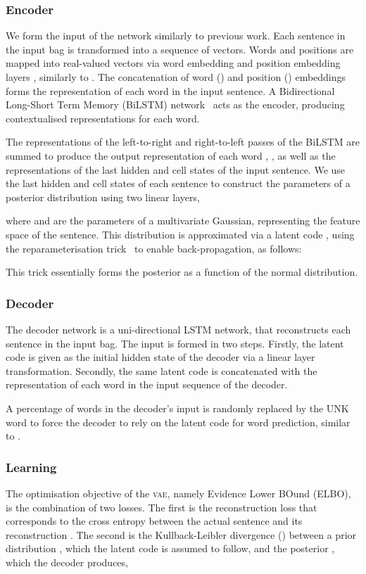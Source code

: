 \documentclass[11pt]{article}
\begin{document}
\subsubsection{Encoder}
\label{sec:encoder}
We form the input of the network similarly to previous work. Each sentence in the input bag is transformed into a sequence of vectors. Words and positions are mapped into real-valued vectors via word embedding  and position embedding layers , similarly to \citet{lin2016neural}. 
The concatenation of word 
() and position () embeddings  
forms the representation of each word in the input sentence. 
A Bidirectional Long-Short Term Memory (BiLSTM) network~\citep{hochreiter1997long} acts as the encoder, producing contextualised representations for each word.

The representations of the left-to-right and right-to-left passes of the BiLSTM are summed to produce the output representation of each word , 
, 
as well as the representations of the last hidden  and cell states  of the input sentence. 
We use the last hidden and cell states of each sentence  to construct the parameters of a posterior distribution  using two linear layers,

where  and  are the parameters of a multivariate Gaussian, representing the feature space of the sentence.
This distribution is approximated via a latent code , using the reparameterisation trick~\citep{kingma2013auto} to enable back-propagation, as follows:

This trick essentially forms the posterior as a function of the normal distribution. 



\subsubsection{Decoder}
\label{sec:decoder}
The decoder network is a uni-directional LSTM network, that reconstructs each sentence in the input bag.
The input is formed in two steps.
Firstly, the latent code  is given as the initial hidden state of the decoder  via a linear layer transformation.
Secondly, the same latent code is concatenated with the representation of each word  in the input sequence of the decoder. 

A percentage of words in the decoder's input is randomly replaced by the UNK word to force the decoder to rely on the latent code for word prediction, similar to \citet{bowman2016generating}.



\subsubsection{Learning}
\label{sec:learning}
The optimisation objective of the \textsc{vae}, namely Evidence Lower BOund (ELBO), is the combination of two losses. The first is the reconstruction loss that corresponds to the cross entropy between the actual sentence  and its reconstruction .
The second is the Kullback-Leibler divergence () between a prior distribution , which the latent code is assumed to follow, and the posterior , which the decoder produces,
\end{document}
